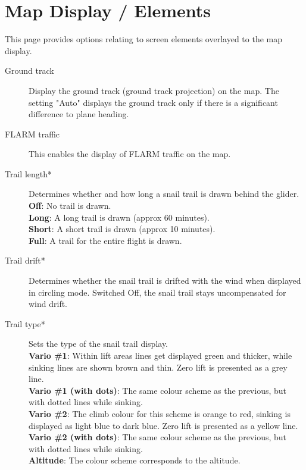 \section{Map Display / Elements}\label{sec:map-elements}

This page provides options relating to screen elements overlayed to the map display.

\begin{description}
\item[Ground track]  Display the ground track (ground track projection) on the map.
  The setting "Auto" displays the ground track only if there is a significant 
  difference to plane heading.
\item[FLARM traffic]  \label{conf:flarm-on-map} This enables the display of FLARM 
  traffic on the map.
\item[Trail length*] \label{conf:snailtrail} Determines whether and how long a
  snail trail is drawn behind the glider. \\
  {\bf Off}: No trail is drawn. \\
  {\bf Long}: A long trail is drawn (approx 60 minutes). \\
  {\bf Short}: A short trail is drawn (approx 10 minutes). \\
  {\bf Full}: A trail for the entire flight is drawn.
\item[Trail drift*] \label{conf:traildrift} Determines whether the
  snail trail is drifted with the wind when displayed in circling mode.  Switched Off,
  the snail trail stays uncompensated for wind drift.
\item[Trail type*] \label{conf:snailtype} Sets the type of the snail trail display. \\
  {\bf Vario \#1}: Within lift areas lines get displayed green and
  thicker, while sinking lines are shown brown and thin.  Zero lift
  is presented as a grey line. \\
  {\bf Vario \#1 (with dots)}: The same colour scheme as the previous, but with dotted 
  lines while sinking. \\
  {\bf Vario \#2}: The climb colour for this scheme is orange to red, sinking is
  displayed as light blue to dark blue. Zero lift is presented as a yellow line. \\
  {\bf Vario \#2 (with dots)}: The same colour scheme as the previous, but with dotted 
  lines while sinking. \\
  {\bf Altitude}: The colour scheme corresponds to the altitude.

\end{description}

